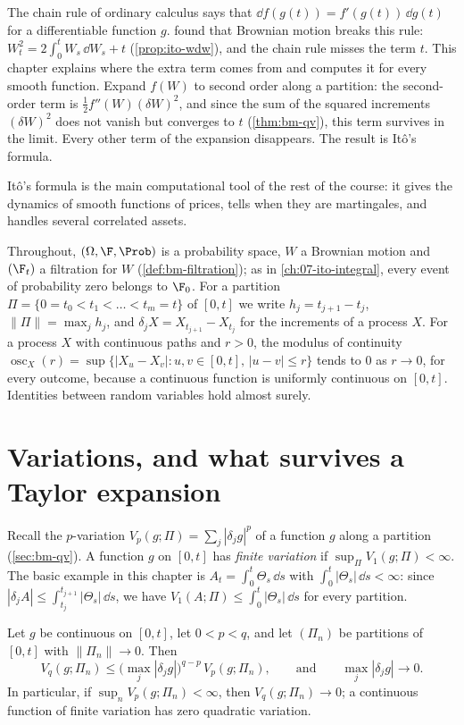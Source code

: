 
The chain rule of ordinary calculus says that $\dd f(g(t))=f'(g(t))\,\dd g(t)$ for a
differentiable function $g$.  found that Brownian motion breaks
this rule: $W_t^2=2\int_0^tW_s\,\dd W_s+t$ (\cref{prop:ito-wdw}), and the chain rule misses
the term $t$. This chapter explains where the extra term comes from and computes it for
every smooth function. Expand $f(W)$ to second order along a partition: the second-order
term is $\frac12f''(W)(\delta W)^2$, and since the sum of the squared increments
$(\delta W)^2$ does not vanish but converges to $t$ (\cref{thm:bm-qv}), this term survives in
the limit. Every other term of the expansion disappears. The result is It\^o's formula.

It\^o's formula is the main computational tool of the rest of the course: it gives the dynamics
of smooth functions of prices, tells when they are martingales, and handles several correlated
assets.

Throughout, $(\Omega,\F,\Prob)$ is a probability space, $W$ a Brownian motion and $(\F_t)$ a
filtration for $W$ (\cref{def:bm-filtration}); as in \cref{ch:07-ito-integral}, every event of
probability zero belongs to $\F_0$. For a partition
$\Pi=\{0=t_0<t_1<\dots<t_m=t\}$ of $[0,t]$ we write $h_j=t_{j+1}-t_j$, $\|\Pi\|=\max_jh_j$,
and $\delta_jX=X_{t_{j+1}}-X_{t_j}$ for the increments of a process $X$. For a process $X$ with
continuous paths and $r>0$, the modulus of continuity
$\operatorname{osc}_X(r)=\sup\{|X_u-X_v|:u,v\in[0,t],\,|u-v|\le r\}$ tends to $0$ as
$r\to0$, for every outcome, because a continuous function is uniformly continuous on
$[0,t]$. Identities between random variables hold almost surely.

\section{Variations, and what survives a Taylor expansion}\label{sec:itf-variations}

Recall the $p$-variation $V_p(g;\Pi)=\sum_j|\delta_jg|^p$ of a function $g$ along a partition
(\cref{sec:bm-qv}). A function $g$ on $[0,t]$ has \emph{finite variation} if
$\sup_\Pi V_1(g;\Pi)<\infty$. The basic example in this chapter is
$A_t=\int_0^t\Theta_s\,\dd s$ with $\int_0^t|\Theta_s|\,\dd s<\infty$: since
$|\delta_jA|\le\int_{t_j}^{t_{j+1}}|\Theta_s|\,\dd s$, we have
$V_1(A;\Pi)\le\int_0^t|\Theta_s|\,\dd s$ for every partition.

\begin{lemma}\label{lem:itf-variation}
Let $g$ be continuous on $[0,t]$, let $0<p<q$, and let $(\Pi_n)$ be partitions of $[0,t]$ with
$\|\Pi_n\|\to0$. Then
\[
  V_q(g;\Pi_n)\le\Big(\max_j|\delta_jg|\Big)^{q-p}\,V_p(g;\Pi_n),
  \qquad\text{and}\qquad \max_j|\delta_jg|\to0 .
\]
In particular, if $\sup_nV_p(g;\Pi_n)<\infty$, then $V_q(g;\Pi_n)\to0$; a continuous function
of finite variation has zero quadratic variation.
\end{lemma}

